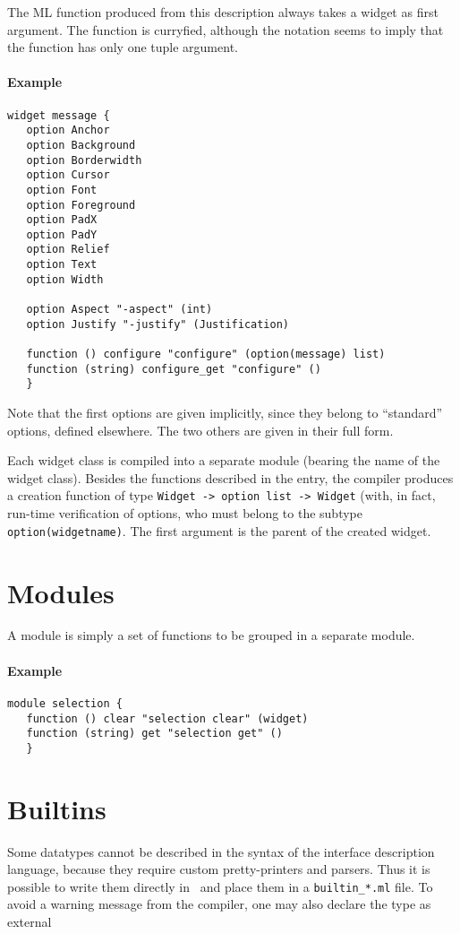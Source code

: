 The ML function produced from this description always takes a widget as
first argument. The function is curryfied, although the notation seems to
imply that the function has only one tuple argument.


\paragraph{Example}
\begin{verbatim}
widget message {
   option Anchor
   option Background
   option Borderwidth
   option Cursor
   option Font
   option Foreground
   option PadX
   option PadY
   option Relief
   option Text
   option Width

   option Aspect "-aspect" (int)
   option Justify "-justify" (Justification)

   function () configure "configure" (option(message) list)
   function (string) configure_get "configure" ()
   }
\end{verbatim}
Note that the first options are given implicitly, since they belong to
``standard'' options, defined elsewhere. The two others are given in their
full form. 

Each widget class is compiled into a separate module (bearing the name of the
widget class). Besides the functions described in the entry, the compiler
produces a creation function of type \verb|Widget -> option list -> Widget|
(with, in fact, run-time verification of options, who must belong to the
subtype \verb|option(widgetname)|. The first argument is the parent of the
created widget.


\section{Modules}
A module is simply a set of functions to be grouped in a separate module.
\paragraph{Example}
\begin{verbatim}
module selection {
   function () clear "selection clear" (widget)
   function (string) get "selection get" ()
   }
\end{verbatim} 

\section{Builtins}
Some datatypes cannot be described in the syntax of the interface
description language, because they require custom pretty-printers and
parsers. Thus it is possible to write them directly in \caml\ and place
them in a \verb|builtin_*.ml| file.
To avoid a warning message from the compiler, one may also declare the type
as external
